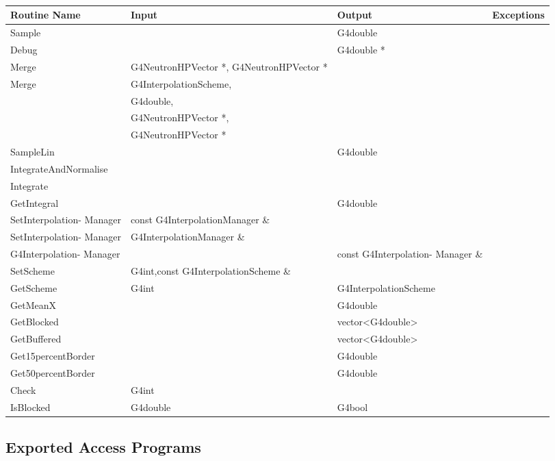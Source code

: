 \documentclass[12pt]{article}
\begin{document}
\\
\\
\\
\begin{tabular}{| p{4cm} | p{4cm} | p{4cm} |  p{4cm} |}
\hline
Routine Name & Input & Output & Exceptions \\ \hline
Sample & & G4double & \\ \hline
Debug & & G4double * & \\ \hline
Merge & G4NeutronHPVector *,  G4NeutronHPVector *& & \\ \hline
Merge & G4InterpolationScheme, & & \\ 
&  G4double,  & & \\
& G4NeutronHPVector *,  & & \\
& G4NeutronHPVector * & & \\ \hline
SampleLin & & G4double & \\ \hline
IntegrateAndNormalise & & & \\ \hline
Integrate & & & \\ \hline
GetIntegral & & G4double & \\ \hline
SetInterpolation- Manager & const G4InterpolationManager \& & & \\ \hline
SetInterpolation- Manager & G4InterpolationManager \& & & \\ \hline
G4Interpolation- Manager & & const G4Interpolation- Manager  \& & \\ \hline
SetScheme & G4int,const G4InterpolationScheme \& & & \\ \hline
GetScheme & G4int & G4InterpolationScheme & \\ \hline
GetMeanX & & G4double & \\ \hline
GetBlocked & & vector\textless G4double\textgreater & \\ \hline
GetBuffered & & vector\textless G4double\textgreater & \\ \hline
Get15percentBorder & & G4double & \\ \hline
Get50percentBorder & & G4double & \\ \hline
Check & G4int & & \\ \hline
IsBlocked & G4double & G4bool & \\ \hline
\end{tabular}

\subsection{Exported Access Programs}%
\end{document}

